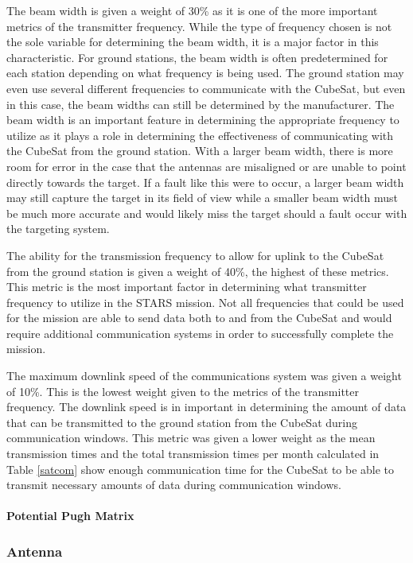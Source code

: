 \documentclass{ece}
\begin{document}
The beam width is given a weight of 30\% as it is one of the more important metrics of the transmitter frequency. While the type of frequency chosen is not the sole variable for determining the beam width, it is a major factor in this characteristic. For ground stations, the beam width is often predetermined for each station depending on what frequency is being used. The ground station may even use several different frequencies to communicate with the CubeSat, but even in this case, the beam widths can still be determined by the manufacturer. The beam width is an important feature in determining the appropriate frequency to utilize as it plays a role in determining the effectiveness of communicating with the CubeSat from the ground station. With a larger beam width, there is more room for error in the case that the antennas are misaligned or are unable to point directly towards the target. If a fault like this were to occur, a larger beam width may still capture the target in its field of view while a smaller beam width must be much more accurate and would likely miss the target should a fault occur with the targeting system. 

The ability for the transmission frequency to allow for uplink to the CubeSat from the ground station is given a weight of 40\%, the highest of these metrics. This metric is the most important factor in determining what transmitter frequency to utilize in the STARS mission. Not all frequencies that could be used for the mission are able to send data both to and from the CubeSat and would require additional communication systems in order to successfully complete the mission. 

The maximum downlink speed of the communications system was given a weight of 10\%. This is the lowest weight given to the metrics of the transmitter frequency. The downlink speed is in important in determining the amount of data that can be transmitted to the ground station from the CubeSat during communication windows. This metric was given a lower weight as the mean transmission times and the total transmission times per month calculated in Table \ref{satcom} show enough communication time for the CubeSat to be able to transmit necessary amounts of data during communication windows. 

\paragraph{Potential Pugh Matrix}


\subsubsection{Antenna}
\end{document}
